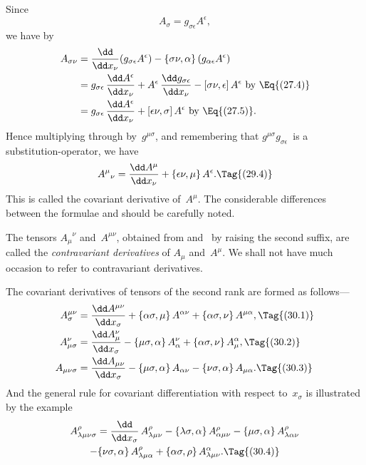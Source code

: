 \documentclass[12pt]{book}
\begin{document}
Since
\[
A_{\sigma} = g_{\sigma\epsilon} A^{\epsilon},
\]
we have by~
\begin{align*}
  A_{\sigma\nu}
  &= \frac{\dd}{\dd x_{\nu}} (g_{\sigma\epsilon} A^{\epsilon}) - \{\sigma\nu, \alpha\}\, (g_{\alpha\epsilon} A^{\epsilon}) \\
  &= g_{\sigma\epsilon}\, \frac{\dd A^{\epsilon}}{\dd x_{\nu}} + A^{\epsilon}\, \frac{\dd g_{\sigma\epsilon}}{\dd x_{\nu}} - [\sigma\nu, \epsilon]\, A^{\epsilon} \text{ by~\Eq{(27.4)}} \\
  &= g_{\sigma\epsilon}\, \frac{\dd A^{\epsilon}}{\dd x_{\nu}} + [\epsilon\nu, \sigma]\, A^{\epsilon} \text{ by~\Eq{(27.5)}.}
\end{align*}
Hence multiplying through by~$g^{\mu\sigma}$, and remembering that $g^{\mu\sigma}g_{\sigma\epsilon}$~is a
substitution-operator, we have
\[
{A^{\mu}}_{\nu} = \frac{\dd A^{\mu}}{\dd x_{\nu}} + \{\epsilon\nu, \mu\}\, A^{\epsilon}.
\Tag{(29.4)}
\]
This is called the covariant derivative of~$A^{\mu}$. The considerable differences
%
%
%
between the formulae  and  should be carefully noted.

The tensors ${A_{\mu}}^{\nu}$ and~$A^{\mu\nu}$, obtained from  and~ by raising the
second suffix, are called the \emph{contravariant derivatives} of $A_{\mu}$ and~$A^{\mu}$. We shall
%
not have much occasion to refer to contravariant derivatives.


The covariant derivatives of tensors of the second rank are formed as
follows---
\begin{align*}
  A_{\sigma}^{\mu\nu} &= \frac{\dd A^{\mu\nu}}{\dd x_{\sigma}}
    + \{\alpha\sigma, \mu\}\, A^{\alpha\nu} + \{\alpha\sigma, \nu\}\, A^{\mu\alpha},
\Tag{(30.1)} \\
  A_{\mu\sigma}^{\nu} &= \frac{\dd A_{\mu}^{\nu}}{\dd x_{\sigma}}
    - \{\mu\sigma, \alpha\}\, A_{\alpha}^{\nu} + \{\alpha\sigma, \nu\}\, A_{\mu}^{\alpha},
\Tag{(30.2)} \\
  A_{\mu\nu\sigma} &= \frac{\dd A_{\mu\nu}}{\dd x_{\sigma}}
    - \{\mu\sigma, \alpha\}\, A_{\alpha\nu} - \{\nu\sigma, \alpha\}\, A_{\mu\alpha}.
\Tag{(30.3)}
\end{align*}
And the general rule for covariant differentiation with respect to~$x_{\sigma}$ is
illustrated by the example
\begin{multline*}
  A_{\lambda\mu\nu\sigma}^{\rho}
  = \frac{\dd}{\dd x_{\sigma}}\, A_{\lambda\mu\nu}^{\rho}
  - \{\lambda\sigma, \alpha\}\, A_{\alpha\mu\nu}^{\rho}
  - \{\mu\sigma, \alpha\}\, A_{\lambda\alpha\nu}^{\rho} \\
  - \{\nu\sigma, \alpha\}\, A_{\lambda\mu\alpha}^{\rho}
  + \{\alpha\sigma, \rho\}\, A_{\lambda\mu\nu}^{\alpha}.
  \Tag{(30.4)}
\end{multline*}
\end{document}
